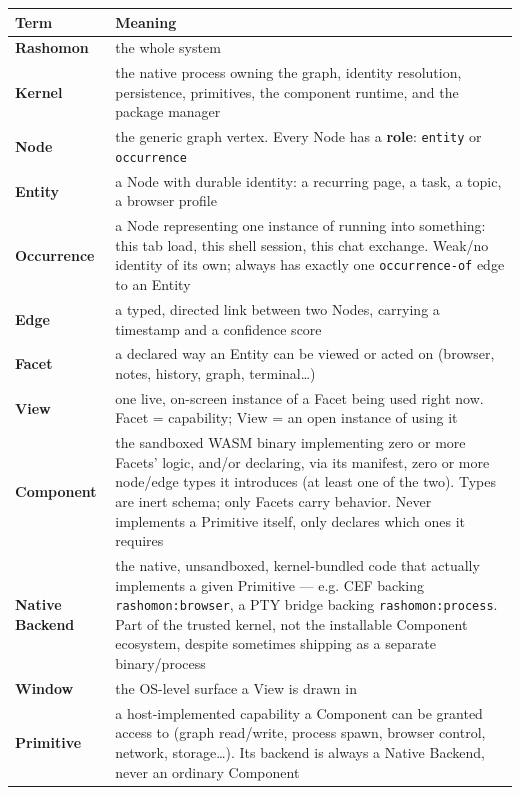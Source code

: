 \documentclass[11pt]{article}
\begin{document}
\begin{center}
\begin{tabularx}{\textwidth}{lX}
\toprule
Term & Meaning\\
\midrule
\textbf{Rashomon} & the whole system\\
\textbf{Kernel} & the native process owning the graph, identity resolution, persistence, primitives, the component runtime, and the package manager\\
\textbf{Node} & the generic graph vertex. Every Node has a \textbf{role}: \texttt{entity} or \texttt{occurrence}\\
\textbf{Entity} & a Node with durable identity: a recurring page, a task, a topic, a browser profile\\
\textbf{Occurrence} & a Node representing one instance of running into something: this tab load, this shell session, this chat exchange. Weak/no identity of its own; always has exactly one \texttt{occurrence-of} edge to an Entity\\
\textbf{Edge} & a typed, directed link between two Nodes, carrying a timestamp and a confidence score\\
\textbf{Facet} & a declared way an Entity can be viewed or acted on (browser, notes, history, graph, terminal…)\\
\textbf{View} & one live, on-screen instance of a Facet being used right now. Facet = capability; View = an open instance of using it\\
\textbf{Component} & the sandboxed WASM binary implementing zero or more Facets' logic, and/or declaring, via its manifest, zero or more node/edge types it introduces (at least one of the two). Types are inert schema; only Facets carry behavior. Never implements a Primitive itself, only declares which ones it requires\\
\textbf{Native Backend} & the native, unsandboxed, kernel-bundled code that actually implements a given Primitive — e.g. CEF backing \texttt{rashomon:browser}, a PTY bridge backing \texttt{rashomon:process}. Part of the trusted kernel, not the installable Component ecosystem, despite sometimes shipping as a separate binary/process\\
\textbf{Window} & the OS-level surface a View is drawn in\\
\textbf{Primitive} & a host-implemented capability a Component can be granted access to (graph read/write, process spawn, browser control, network, storage…). Its backend is always a Native Backend, never an ordinary Component\\
\bottomrule
\end{tabularx}
\end{center}
\end{document}
